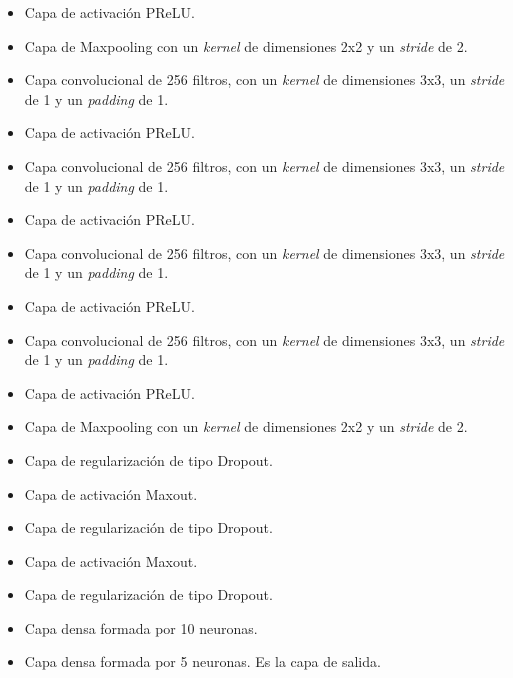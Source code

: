 \begin{itemize}
    \item Capa de activación PReLU.
    \item Capa de Maxpooling con un \textit{kernel} de dimensiones 2x2 y un \textit{stride} de 2.
    \item Capa convolucional de 256 filtros, con un \textit{kernel} de dimensiones 3x3, un \textit{stride} de 1 y un \textit{padding} de 1.
    \item Capa de activación PReLU.
    \item Capa convolucional de 256 filtros, con un \textit{kernel} de dimensiones 3x3, un \textit{stride} de 1 y un \textit{padding} de 1.
    \item Capa de activación PReLU.
    \item Capa convolucional de 256 filtros, con un \textit{kernel} de dimensiones 3x3, un \textit{stride} de 1 y un \textit{padding} de 1.
    \item Capa de activación PReLU.
    \item Capa convolucional de 256 filtros, con un \textit{kernel} de dimensiones 3x3, un \textit{stride} de 1 y un \textit{padding} de 1.
    \item Capa de activación PReLU.
    \item Capa de Maxpooling con un \textit{kernel} de dimensiones 2x2 y un \textit{stride} de 2.
    \item Capa de regularización de tipo Dropout.
    \item Capa de activación Maxout.
    \item Capa de regularización de tipo Dropout.
    \item Capa de activación Maxout.
    \item Capa de regularización de tipo Dropout.
    \item Capa densa formada por 10 neuronas.
    \item Capa densa formada por 5 neuronas. Es la capa de salida.
\end{itemize}

